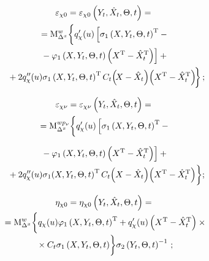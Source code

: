 \begin{multicols}{2}
\vspace*{-12pt}

    \noindent
    \begin{multline*}
    \varepsilon_{\chi 0}= \varepsilon_{\chi 0} \left(Y_t,\hat X_t,\Theta,t\right)
    ={}\\
    {}={\rm M}_{\Delta^x}^{w}\biggl\{ q_\chi '(u) \left[ \sigma_1 
    \left(X,Y_t,\Theta,t\right)^{\mathrm{T}}-{}\right.\\
\left.    {}
    -\varphi_1 \left(X,Y_t,\Theta,t\right) 
    \left(X^{\mathrm{T}}-\hat X_t^{\mathrm{T}}\right)\right]+{}\\
{}+ 2q_\chi'' (u)\sigma_1 \left(X,Y_t,\Theta,t\right)^{\mathrm{T}} 
C_t\!\left(\!X-\hat X_t\right)\!\left(X^{\mathrm{T}}-\hat X_t^{\mathrm{T}}\right)\!\biggr\}\,;
\hspace*{-4.18732pt}
\end{multline*}

\vspace*{-12pt}

    \noindent
    \begin{multline*}
    \varepsilon_{\chi \nu}= \varepsilon_{\chi \nu} \left(Y_t,\hat X_t,\Theta,t\right)
    ={}\\
    {}={\rm M}_{\Delta^x}^{w p_\nu} \biggl\{ q_\chi'(u) 
    \left[ \sigma_1 \left(X,Y_t,\Theta,t\right)^{\mathrm{T}}
    -{}\right.
    \end{multline*}
    
\noindent
    \begin{multline*}
\left.    {}-\varphi_1\left(X,Y_t,\Theta,t\right)\left(X^{\mathrm{T}}-\hat X_t^{\mathrm{T}}
    \right)\right]+{}\\
{}+ 2q_\chi'' (u)\sigma_1 \!\left(X,Y_t,\Theta,t\right)^{\mathrm{T}} C_t\!
\left(X-\hat X_t\right)\!\left(X^{\mathrm{T}}-\hat X_t^{\mathrm{T}}\right)\biggr\};\hspace*{-4.18732pt}
\end{multline*}


    \noindent
    \begin{multline*}
    \eta_{\chi 0} = \eta_{\chi 0} \left(Y_t,\hat X_t,\Theta,t\right)
    ={}\\[-2pt]
    {}={\rm M}_{\Delta^x}^{w}\biggl\{ q_\chi (u) \varphi_1 \left(X,Y_t,\Theta,t\right)^{\mathrm{T}} 
    + q_\chi' (u)\left(X^{\mathrm{T}}-\hat X_t^{\mathrm{T}}\right)\times{}\\[-2pt]
    {}\times C_t \sigma_1 \left(X,Y_t,\Theta,t\right)\biggr\}  
    \sigma_2 \left(Y_t,\Theta,t\right)^{-1}\,;
    \end{multline*}
    

\end{multicols}
